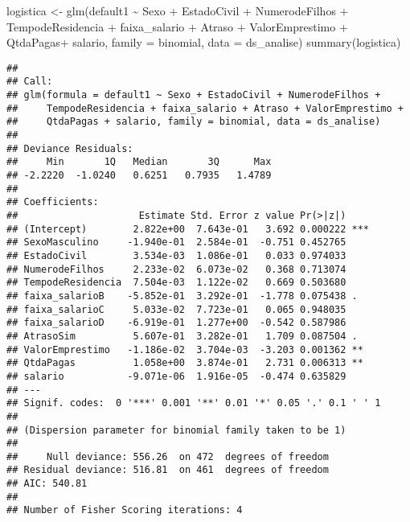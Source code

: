 \documentclass[
]{article}
\newenvironment{Shaded}{\begin{snugshade}}{\end{snugshade}}
\newcommand{\AttributeTok}[1]{\textcolor[rgb]{0.77,0.63,0.00}{#1}}
\newcommand{\FunctionTok}[1]{\textcolor[rgb]{0.00,0.00,0.00}{#1}}
\newcommand{\NormalTok}[1]{#1}
\newcommand{\OtherTok}[1]{\textcolor[rgb]{0.56,0.35,0.01}{#1}}
\newcommand{\SpecialCharTok}[1]{\textcolor[rgb]{0.00,0.00,0.00}{#1}}
\begin{document}
\begin{Shaded}
\begin{Highlighting}[]
\NormalTok{logistica }\OtherTok{\textless{}{-}} \FunctionTok{glm}\NormalTok{(default1 }\SpecialCharTok{\textasciitilde{}}\NormalTok{ Sexo }\SpecialCharTok{+} 
\NormalTok{                            EstadoCivil }\SpecialCharTok{+} 
\NormalTok{                            NumerodeFilhos }\SpecialCharTok{+} 
\NormalTok{                            TempodeResidencia }\SpecialCharTok{+}
\NormalTok{                            faixa\_salario  }\SpecialCharTok{+} 
\NormalTok{                            Atraso }\SpecialCharTok{+} 
\NormalTok{                            ValorEmprestimo }\SpecialCharTok{+}
\NormalTok{                            QtdaPagas}\SpecialCharTok{+} 
\NormalTok{                            salario, }\AttributeTok{family =}\NormalTok{ binomial, }\AttributeTok{data =}\NormalTok{ ds\_analise)}
\FunctionTok{summary}\NormalTok{(logistica)}
\end{Highlighting}
\end{Shaded}

\begin{verbatim}
## 
## Call:
## glm(formula = default1 ~ Sexo + EstadoCivil + NumerodeFilhos + 
##     TempodeResidencia + faixa_salario + Atraso + ValorEmprestimo + 
##     QtdaPagas + salario, family = binomial, data = ds_analise)
## 
## Deviance Residuals: 
##     Min       1Q   Median       3Q      Max  
## -2.2220  -1.0240   0.6251   0.7935   1.4789  
## 
## Coefficients:
##                     Estimate Std. Error z value Pr(>|z|)    
## (Intercept)        2.822e+00  7.643e-01   3.692 0.000222 ***
## SexoMasculino     -1.940e-01  2.584e-01  -0.751 0.452765    
## EstadoCivil        3.534e-03  1.086e-01   0.033 0.974033    
## NumerodeFilhos     2.233e-02  6.073e-02   0.368 0.713074    
## TempodeResidencia  7.504e-03  1.122e-02   0.669 0.503680    
## faixa_salarioB    -5.852e-01  3.292e-01  -1.778 0.075438 .  
## faixa_salarioC     5.033e-02  7.723e-01   0.065 0.948035    
## faixa_salarioD    -6.919e-01  1.277e+00  -0.542 0.587986    
## AtrasoSim          5.607e-01  3.282e-01   1.709 0.087504 .  
## ValorEmprestimo   -1.186e-02  3.704e-03  -3.203 0.001362 ** 
## QtdaPagas          1.058e+00  3.874e-01   2.731 0.006313 ** 
## salario           -9.071e-06  1.916e-05  -0.474 0.635829    
## ---
## Signif. codes:  0 '***' 0.001 '**' 0.01 '*' 0.05 '.' 0.1 ' ' 1
## 
## (Dispersion parameter for binomial family taken to be 1)
## 
##     Null deviance: 556.26  on 472  degrees of freedom
## Residual deviance: 516.81  on 461  degrees of freedom
## AIC: 540.81
## 
## Number of Fisher Scoring iterations: 4
\end{verbatim}
\end{document}
